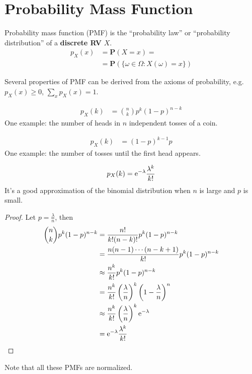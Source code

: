 \section{Probability Mass Function}
\begin{definition}
    Probability mass function (PMF) is the ``probability law'' or ``probability distribution'' of a \textbf{discrete RV} $X$.
    \begin{align}
        p_{X}(x) &= \mathbf{P}(X = x) = \\ 
                 &= \mathbf{P}(\{\omega \in \varOmega: X(\omega) = x\})
    \end{align}
\end{definition}
Several properties of PMF can be derived from the axioms of probability, e.g. $p_{X}(x) \geq 0$, $\sum_{x} p_{X}(x) = 1$.
\begin{example}
    \begin{align}
        p_{X}(k) &= \binom{n}{k} p^{k} (1-p)^{n-k}
    \end{align}
    One example: the number of heads in $n$ independent tosses of a coin.
\end{example}
\begin{example}
    \begin{align}
        p_{X}(k) &= (1-p)^{k-1} p
    \end{align}
    One example: the number of tosses until the first head appears.
\end{example}
\begin{example}
    \begin{align}
        p_{X}(k) = \mathrm{e}^{-\lambda} \frac{\lambda^{k}}{k!}
    \end{align}
    It's a good approximation of the binomial distribution when $n$ is large and $p$ is small.
    \begin{proof}
        Let $p = \frac{\lambda}{n}$, then
        \begin{equation}
        \begin{aligned}
            \binom{n}{k} p^{k} (1-p)^{n-k} &= \frac{n!}{k!(n-k)!} p^{k} (1-p)^{n-k} \\
            &= \frac{n(n-1)\cdots(n-k+1)}{k!} p^{k} (1-p)^{n-k} \\
            &\approx \frac{n^{k}}{k!} p^{k} (1-p)^{n-k} \\
            &= \frac{n^{k}}{k!} \left(\frac{\lambda}{n}\right)^{k} \left(1-\frac{\lambda}{n}\right)^{n} \\
            &\approx \frac{n^{k}}{k!} \left(\frac{\lambda}{n}\right)^{k} \mathrm{e}^{-\lambda} \\
            &= \mathrm{e}^{-\lambda} \frac{\lambda^{k}}{k!}
        \end{aligned}
        \end{equation}
    \end{proof}
\end{example}
Note that all these PMFs are normalized.

